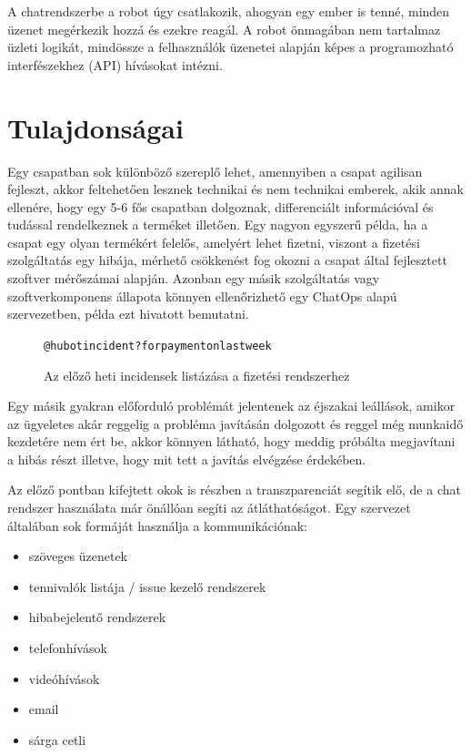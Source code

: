 A chatrendszerbe a robot úgy csatlakozik, ahogyan egy ember is tenné, minden üzenet megérkezik hozzá és ezekre reagál. A robot önmagában nem tartalmaz üzleti logikát, mindössze a felhasználók üzenetei alapján képes a programozható interfészekhez (API) hívásokat intézni.

\section{Tulajdonságai}

\label{subsection:better_communication}
Egy csapatban sok különböző szereplő lehet, amennyiben a csapat agilisan fejleszt, akkor feltehetően lesznek technikai és nem technikai emberek, akik annak ellenére, hogy egy 5-6 fős csapatban dolgoznak, differenciált információval és tudással rendelkeznek a terméket illetően. Egy nagyon egyszerű példa, ha a csapat egy olyan termékért felelős, amelyért lehet fizetni, viszont a fizetési szolgáltatás egy hibája, mérhető csökkenést fog okozni a csapat által fejlesztett szoftver mérőszámai alapján. Azonban egy másik szolgáltatás vagy szoftverkomponens állapota könnyen ellenőrizhető egy ChatOps alapú szervezetben,  példa ezt hivatott bemutatni.\\

\begin{figure}[H]
    \begin{alltt}
    @hubot incident? for payment on last week
    \end{alltt}
    \caption[DUMMY]%
    {Az előző heti incidensek listázása a fizetési rendszerhez}%
    \label{fig:get_outage_for_payment}
\end{figure}

Egy másik gyakran előforduló problémát jelentenek az éjszakai leállások, amikor az ügyeletes akár reggelig a probléma javításán dolgozott és reggel még munkaidő kezdetére nem ért be, akkor könnyen látható, hogy meddig próbálta megjavítani a hibás részt illetve, hogy mit tett a javítás elvégzése érdekében.


Az előző pontban kifejtett okok is részben a transzparenciát segítik elő, de a chat rendszer használata már önállóan segíti az átláthatóságot.
Egy szervezet általában sok formáját használja a kommunikációnak:

\begin{itemize}
  \item szöveges üzenetek
  \item tennivalók listája / issue kezelő rendszerek
  \item hibabejelentő rendszerek
  \item telefonhívások
  \item videóhívások
  \item email
  \item sárga cetli
\end{itemize}

